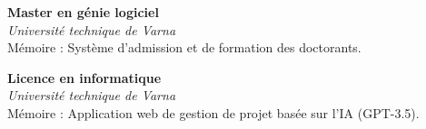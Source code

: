 \textbf{Master en génie logiciel}  \\
\textit{Université technique de Varna} \\
\footnotesize Mémoire : Système d'admission et de formation des doctorants. \par

\vspace{1ex}
\textbf{Licence en informatique}  \\
\textit{Université technique de Varna} \\
\footnotesize Mémoire : Application web de gestion de projet basée sur l'IA (GPT-3.5).
